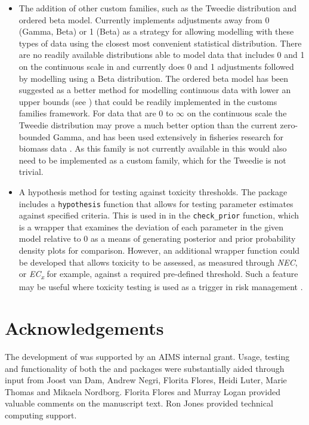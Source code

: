 \documentclass[
  shortnames]{jss}
\begin{document}
\begin{itemize}
\item
  The addition of other custom families, such as the Tweedie distribution and ordered beta model. Currently  implements adjustments away from 0 (Gamma, Beta) or 1 (Beta) as a strategy for allowing modelling with these types of data using the closest most convenient statistical distribution.
  There are no readily available distributions able to model data that includes 0 and 1 on the continuous scale in  and  currently does 0 and 1 adjustments followed by modelling using a Beta distribution. The ordered beta model has been suggested as a better method for modelling continuous data with lower an upper bounds (see \citet{Kubinec}) that could be readily implemented in the  customs families framework.
  For data that are 0 to \(\infty\) on the continuous scale the Tweedie distribution may prove a much better option than the current zero-bounded Gamma, and has been used extensively in fisheries research for biomass data \citep{Shono2008}. As this family is not currently available in  this would also need to be implemented as a custom family, which for the Tweedie is not trivial.
\item
  A hypothesis method for testing against toxicity thresholds. The  package includes a \texttt{hypothesis} function that allows for testing parameter estimates against specified criteria. This is used in  in the \texttt{check\_prior} function, which is a wrapper that examines the deviation of each parameter in the given model relative to 0 as a means of generating posterior and prior probability density plots for comparison. However, an additional wrapper function could be developed that allows toxicity to be assessed, as measured through \emph{NEC}, or \emph{EC\textsubscript{x}} for example, against a required pre-defined threshold. Such a feature may be useful where toxicity testing is used as a trigger in risk management \citep[for example, using whole-effluent-toxicity (WET) testing,][]{Karman2019}.
\end{itemize}

\hypertarget{acknowledgements}{%
\section{Acknowledgements}\label{acknowledgements}}

The development of  was supported by an AIMS internal grant. Usage, testing and functionality of both the  and  packages were substantially aided through input from Joost van Dam, Andrew Negri, Florita Flores, Heidi Luter, Marie Thomas and Mikaela Nordborg. Florita Flores and Murray Logan provided valuable comments on the manuscript text. Ron Jones provided technical computing support.

\renewcommand\refname{References}

\end{document}
